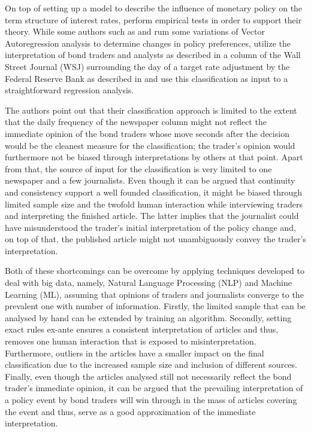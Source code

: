 On top of setting up a model to describe the influence of monetary policy on the term structure of interest rates, \textcite{Ellingsen.2001} perform empirical tests in order to support their theory. While some authors such as \textcite{Peersman.2002} and \textcite{Evans.1998} rum some variations of Vector Autoregression analysis to determine changes in policy preferences, \textcite{Ellingsen.2001} utilize the interpretation of bond traders and analysts as described in a column of the Wall Street Journal (WSJ) surrounding the day of a target rate adjustment by the Federal Reserve Bank as described in \textcite{Ellingsen.2003} and use this classification as input to a straightforward regression analysis.

The authors point out that their classification approach is limited to the extent that the daily frequency of the newspaper column might not reflect the immediate opinion of the bond traders whose move seconds after the decision would be the cleanest measure for the classification; the trader's opinion would furthermore not be biased through interpretations by others at that point. Apart from that, the source of input for the classification is very limited to one newspaper and a few journalists. Even though it can be argued that continuity and consistency support a well founded classification, it might be biased through limited sample size and the twofold human interaction while interviewing traders and interpreting the finished article. The latter implies that the journalist could have misunderstood the trader's initial interpretation of the policy change and, on top of that, the published article might not unambiguously convey the trader's interpretation.

Both of these shortcomings can be overcome by applying techniques developed to deal with big data, namely, Natural Language Processing (NLP) and Machine Learning (ML), assuming that opinions of traders and journalists converge to the prevalent one with number of information. Firstly, the limited sample that can be analysed by hand can be extended by training an algorithm. Secondly, setting exact rules ex-ante ensures a consistent interpretation of articles and thus, removes one human interaction that is exposed to misinterpretation. Furthermore, outliers in the articles have a smaller impact on the final classification due to the increased sample size and inclusion of different sources. Finally, even though the articles analysed still not necessarily reflect the bond trader's immediate opinion, it can be argued that the prevailing interpretation of a policy event by bond traders will win through in the mass of articles covering the event and thus, serve as a good approximation of the immediate interpretation. 

